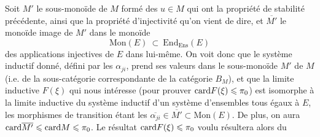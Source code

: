 Soit $M'$ le sous-monoïde de $M$ formé des $u \in M$ qui ont la propriété de stabilité précédente, ainsi que la propriété d'injectivité qu'on vient de dire, et $\overline{M'}$ le monoïde image de $M'$ dans le monoïde
\[
\mathrm{Mon}(E) \ \subset \ \mathrm{End}_{\mathrm{Ens}}(E)
\]
des applications injectives de $E$ dans lui-même. On voit donc que le système inductif donné, défini par les $\alpha_{ji}$, prend ses valeurs dans le sous-monoïde $M'$ de $M$ (i.e. de la sous-catégorie correspondante de la catégorie $B_M$), et que la limite inductive $F(\xi)$ qui nous intéresse (pour prouver $\mathrm{card} F(\xi) \leqslant \pi_0$) est isomorphe à la limite inductive du système inductif d'un système d'ensembles tous égaux à $E$, les morphismes de transition étant les $\overline{\alpha_{ji}} \in \overline{M'} \subset \mathrm{Mon}(E)$. De plus, on aura $\mathrm{card} \overline{M'} \leqslant \mathrm{card} M \leqslant \pi_0$. Le résultat $\mathrm{card} F(\xi) \leqslant \pi_0$ voulu résultera alors du

